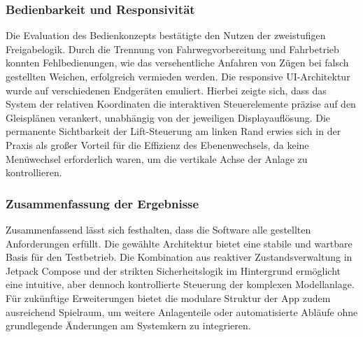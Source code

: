 \documentclass{article}
\begin{document}
\subsubsection{Bedienbarkeit und Responsivität}
Die Evaluation des Bedienkonzepts bestätigte den Nutzen der zweistufigen Freigabelogik. Durch die Trennung von Fahrwegvorbereitung und Fahrbetrieb konnten Fehlbedienungen, wie das versehentliche Anfahren von Zügen bei falsch gestellten Weichen, erfolgreich vermieden werden. Die responsive UI-Architektur wurde auf verschiedenen Endgeräten emuliert. Hierbei zeigte sich, dass das System der relativen Koordinaten die interaktiven Steuerelemente präzise auf den Gleisplänen verankert, unabhängig von der jeweiligen Displayauflösung. Die permanente Sichtbarkeit der Lift-Steuerung am linken Rand erwies sich in der Praxis als großer Vorteil für die Effizienz des Ebenenwechsels, da keine Menüwechsel erforderlich waren, um die vertikale Achse der Anlage zu kontrollieren.

\subsubsection{Zusammenfassung der Ergebnisse}
Zusammenfassend lässt sich festhalten, dass die Software alle gestellten Anforderungen erfüllt. Die gewählte Architektur bietet eine stabile und wartbare Basis für den Testbetrieb. Die Kombination aus reaktiver Zustandsverwaltung in Jetpack Compose und der strikten Sicherheitslogik im Hintergrund ermöglicht eine intuitive, aber dennoch kontrollierte Steuerung der komplexen Modellanlage. Für zukünftige Erweiterungen bietet die modulare Struktur der App zudem ausreichend Spielraum, um weitere Anlagenteile oder automatisierte Abläufe ohne grundlegende Änderungen am Systemkern zu integrieren.
\end{document}
